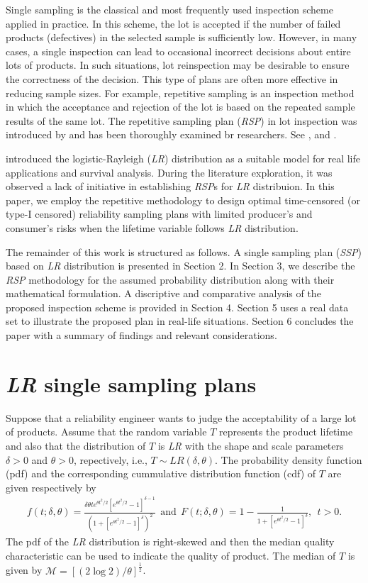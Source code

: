 \documentclass[twoside]{article}
\begin{document}
Single sampling is the classical and most frequently used inspection scheme applied in practice. In this scheme, the lot is accepted if the number of failed products (defectives) in the selected sample is sufficiently low. However, in many cases, a single inspection can lead to occasional incorrect decisions about entire lots of products. In such situations, lot reinspection may be desirable to ensure the correctness of the decision. 
This type of plans are often more effective in reducing sample sizes. For example, repetitive sampling  is an inspection method in which the acceptance and rejection of the lot is based on the repeated sample results of the same lot. 
The repetitive  sampling plan (\textit{RSP}) in lot inspection  was introduced by \cite{Sherman}
and has been thoroughly examined br researchers. See \cite{Jeya2025}, \cite{NM2025} and \cite{NFC2026}.


\cite{Cha} introduced the logistic-Rayleigh (\textit{LR}) distribution as a suitable model for  real life applications and survival analysis. During the literature exploration, it was observed a lack of initiative in establishing \textit{RSP}s for \textit{LR} distribuion. In this paper, we employ the  repetitive methodology to design optimal time-censored (or type-I censored) reliability sampling plans with limited producer's and consumer's risks when the lifetime variable follows \textit{LR}  distribution.


The remainder of this work is structured as follows.
A single sampling plan (\textit{SSP}) based on  \textit{LR} distribution is presented in Section 2.
In Section 3, we describe the   \textit{RSP} methodology for the assumed probability distribution along with their mathematical formulation.
A discriptive and comparative analysis of the proposed inspection scheme is provided in Section 4.
 Section 5 uses a real data set to illustrate the proposed plan in real-life situations.
Section 6 concludes the paper with a summary of findings and relevant considerations.



\section{\textit{LR} single sampling plans}
Suppose that a reliability engineer wants to judge the acceptability of a large lot of products. Assume that the random variable $T$ represents the product lifetime and also that the distribution of $T$ is \textit{LR} with the shape and scale parameters $\delta>0$ and $\theta>0$, repectively, i.e., $T\sim LR(\delta,\theta)$. 
The probability density function (pdf) and the corresponding cummulative distribution function (cdf) of $T$ are given respectively by 
\begin{eqnarray}\label{pdfcdf}
f(t;\delta,\theta)=\frac{\delta\theta te^{\theta t^2/2}[e^{\theta t^2/2}-1]^{\delta-1}}{(1+[e^{\theta t^2/2}-1]^{\delta})^{2}}~~\textrm{and}
~~F(t;\delta,\theta)=1-\frac{1}{1+[e^{\theta t^2/2}-1]^{\delta}},~~t>0.
\end{eqnarray}
The pdf of the \textit{LR}  distribution is right-skewed and then  the median quality characteristic can be  used to indicate the
quality of product. The median of $T$ is given by $\mathcal{M}=[(2\log 2)/\theta]^{\frac{1}{2}}$.
\end{document}
